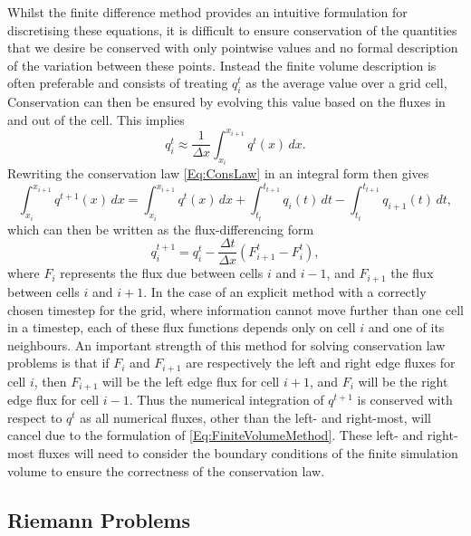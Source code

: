 Whilst the finite difference method provides an intuitive formulation for discretising these equations, it is difficult to ensure conservation of the quantities that we desire be conserved with only pointwise values and no formal description of the variation between these points.
Instead the finite volume description is often preferable and consists of treating $q_i^t$ as the average value over a grid cell,
Conservation can then be ensured by evolving this value based on the fluxes in and out of the cell.
This implies
\begin{equation}
    q_i^t \approx \frac{1}{\Delta x}\int_{x_i}^{x_{i+1}} q^t(x)\, dx.
\end{equation}
Rewriting the conservation law \eqref{Eq:ConsLaw} in an integral form then gives
\begin{equation}
    \int_{x_i}^{x_{i+1}} q^{t+1}(x)\, dx = \int_{x_i}^{x_{i+1}} q^{t}(x)\, dx
                                         + \int_{t_t}^{t_{t+1}} q_i(t)\, dt
                                         - \int_{t_t}^{t_{t+1}} q_{i+1}(t)\, dt,
\end{equation}
which can then be written as the flux-differencing form
\begin{equation}\label{Eq:FiniteVolumeMethod}
    q_i^{t+1} = q_i^t - \frac{\Delta t}{\Delta x}\left( F^t_{i+1} - F^t_{i} \right),
\end{equation}
where $F_i$ represents the flux due between cells $i$ and $i-1$, and $F_{i+1}$ the flux between cells $i$ and $i+1$.
In the case of an explicit method with a correctly chosen timestep for the grid, where information cannot move further than one cell in a timestep, each of these flux functions depends only on cell $i$ and one of its neighbours.
An important strength of this method for solving conservation law problems is that if $F_i$ and $F_{i+1}$ are respectively the left and right edge fluxes for cell $i$, then $F_{i+1}$ will be the left edge flux for cell $i+1$, and $F_{i}$ will be the right edge flux for cell $i-1$.
Thus the numerical integration of $q^{t+1}$ is conserved with respect to $q^t$ as all numerical fluxes, other than the left- and right-most, will cancel due to the formulation of \eqref{Eq:FiniteVolumeMethod}.
These left- and right-most fluxes will need to consider the boundary conditions of the finite simulation volume to ensure the correctness of the conservation law.


\subsection{Riemann Problems}

